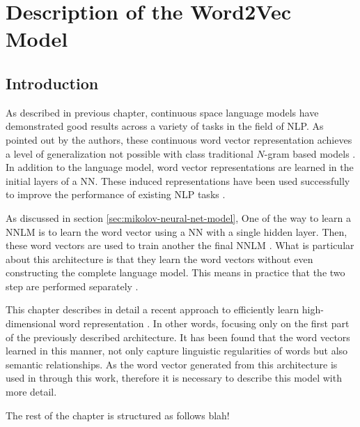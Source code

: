 \chapter{Description of the Word2Vec Model }
\label{chap:word2vec_description}


\section{Introduction}
As described in  previous chapter,  continuous space language  models have
demonstrated good results across a variety of tasks in the field of NLP.  As pointed out by
the authors, these continuous word vector representation achieves a level of
generalization not possible with class traditional $N$-gram based models
\cite{conf/icassp/MikolovKBGC09}. In addition to the language model,  word vector
representations are learned in the initial layers of a \ac{NN}. These
induced representations  have been used successfully to improve the
performance of existing \ac{NLP} tasks \cite{collobert:2008}
\cite{Turian:2010:WRS:1858681.1858721}. 

As discussed in section \ref{sec:mikolov-neural-net-model},  One of the way to learn a
\ac{NNLM} is to learn the word vector using  a \ac{NN} with a single hidden
layer. Then, these word vectors are used to  train another the final
\ac{NNLM} \cite{conf/icassp/MikolovKBGC09}.   
What is particular about this architecture is that they learn the  word
vectors without  even constructing the complete language model.  This means
in practice that the two step are performed separately \cite{conf/icassp/MikolovKBGC09}. 

This chapter describes in detail a recent approach to efficiently learn
high-dimensional word representation \cite{DBLP:journals/corr/abs-1301-3781}.
In other words, focusing only on the first part of the previously described 
architecture. It has been found that the word vectors learned in this manner,
not only capture linguistic regularities of words  but also semantic
relationships. As the word vector generated from this architecture is used in
through this work, therefore it is necessary to describe this model with more
detail.

The rest of the chapter is structured as follows blah!


